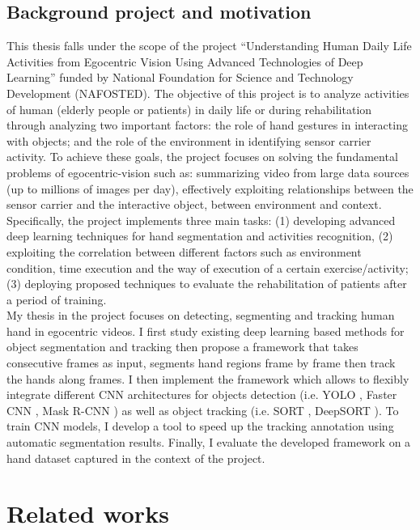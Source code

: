 \subsection{Background project and motivation}
This thesis falls under the scope of the project “Understanding Human Daily Life Activities from Egocentric Vision Using Advanced Technologies of Deep Learning” funded by National Foundation for Science and Technology Development (NAFOSTED). The objective of this project is to analyze activities of human (elderly people or patients) in daily life or during rehabilitation through analyzing two important factors: the role of hand gestures in interacting with objects; and the role of the environment in identifying sensor carrier activity.
To achieve these goals, the project focuses on solving the fundamental problems of egocentric-vision such as: summarizing video from large data sources (up to millions of images per day), effectively exploiting relationships between the sensor carrier and the interactive object, between environment and context. Specifically, the project implements three main tasks: (1) developing advanced deep learning techniques for hand segmentation and activities recognition, (2) exploiting the correlation between different factors such as  environment condition, time execution and the way of execution of a certain exercise/activity; (3) deploying proposed techniques to evaluate the rehabilitation of patients after a period of training.
\\My thesis in the project focuses on detecting, segmenting and tracking human hand in egocentric videos. I first study existing deep learning based methods for object segmentation and tracking then propose a framework that takes consecutive frames as input, segments hand regions frame by frame then track the hands along frames. I then implement the framework which allows to flexibly integrate different CNN architectures for objects detection (i.e. YOLO \cite{DBLP:journals/corr/RedmonDGF15}, Faster CNN \cite{DBLP:journals/corr/RenHG015}, Mask R-CNN \cite{DBLP:journals/corr/HeGDG17}) as well as object tracking (i.e. SORT \cite{DBLP:journals/corr/BewleyGORU16}, DeepSORT \cite{DBLP:journals/corr/WojkeBP17}). To train CNN models, I develop a tool to speed up the tracking annotation using automatic segmentation results. Finally, I evaluate the developed framework on a hand dataset captured in the context of the project.
\section{Related works}
